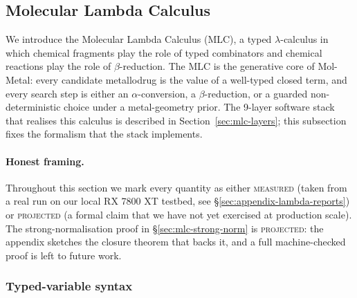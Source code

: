\subsection{Molecular Lambda Calculus}
\label{sec:mlc-formalism}

We introduce the Molecular Lambda Calculus (MLC), a typed
$\lambda$-calculus in which chemical fragments play the role of
typed combinators and chemical reactions play the role of
$\beta$-reduction.
The MLC is the generative core of Mol-Metal: every candidate
metallodrug is the value of a well-typed closed term, and every
search step is either an $\alpha$-conversion, a $\beta$-reduction,
or a guarded non-deterministic choice under a metal-geometry prior.
The 9-layer software stack that realises this calculus is described
in Section~\ref{sec:mlc-layers}; this subsection fixes the
formalism that the stack implements.

\paragraph{Honest framing.}
Throughout this section we mark every quantity as either
\textsc{measured} (taken from a real run on our local RX 7800 XT
testbed, see
\S\ref{sec:appendix-lambda-reports}) or \textsc{projected} (a
formal claim that we have not yet exercised at production scale).
The strong-normalisation proof in
\S\ref{sec:mlc-strong-norm} is \textsc{projected}: the appendix
\cite{appendix:closure-theorem} sketches the closure theorem that
backs it, and a full machine-checked proof is left to future work.

\subsubsection{Typed-variable syntax}
\label{sec:mlc-syntax}

